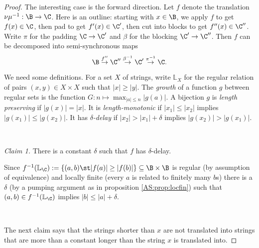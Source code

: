 \begin{proof}
The interesting case is the forward direction.
 Let $f$ denote the translation $\nu\mu^{-1}:\B \to \C$. 
% 
% 
Here is an outline: starting with $x \in \B$, we apply $f$ to get $f(x) \in \C$, then pad to get $f'(x) \in \C'$,
then cut into blocks to get $f''(x) \in \C''$. 
Write $\pi$ for the padding $\C \to \C'$ and $\beta$ for the blocking $\C' \to \C''$.
Then $f$ can be decomposed into semi-synchronous maps
\[
 \B \stackrel{f''}{\to} \C'' \stackrel{\beta^{-1}}{\to} \C' \stackrel{\pi^{-1}}{\to} \C.
\]

We need some definitions. 
For a set $X$ of strings, write $\mathbb{L}_X$ for the regular relation of pairs $(x,y) \in X \times X$ such that $|x| \geq |y|$. 
The {\em growth} of a function $g$ between regular sets is the function 
$G:n \mapsto \max_{|a| \leq n} |g(a)|$. A bijection $g$ is {\em length preserving} if $|g(x)| = |x|$.
It is {\em length-monotonic} if $|x_1| \leq |x_2|$ implies $|g(x_1)| \leq |g(x_2)|$. It has {\em $\delta$-delay} 
if $|x_2| > |x_1| + \delta$ implies $|g(x_2)| > |g(x_1)|$.


\

\noindent
{\em Claim 1.} There is a constant $\delta$ such that $f$ has $\delta$-delay.

Since $f^{-1}(\mathbb{L}_\C) := \{(a,b) \st |f(a)| \geq |f(b)|\} \subseteq \B \times \B$ is regular (by assumption of equivalence) and locally finite (every $a$ is related to finitely many $b$s) 
there is a $\delta$ (by a pumping argument as in proposition \ref{AS:prop:locfin}) such that $(a,b) \in f^{-1}(\mathbb{L}_\C)$ implies $|b| \leq |a| + \delta$.%

\

The next claim says that the strings shorter than $x$ are not translated into strings that are more than a constant longer than the string $x$ is translated into.


\end{proof}
